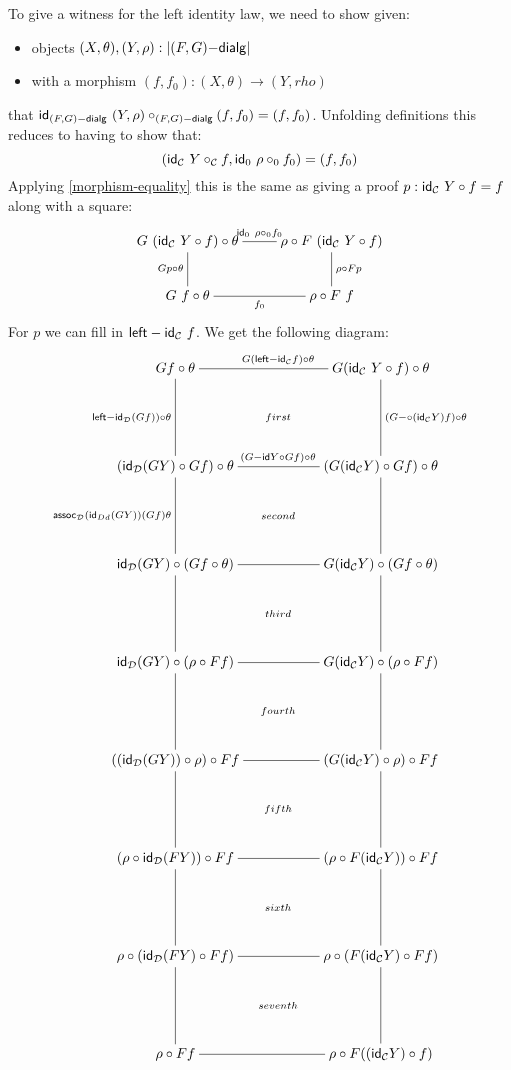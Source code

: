 To give a witness for the left identity law, we need to show given:
\begin{itemize}
\item objects $(X,\theta), (Y,\rho) : |(F,G)\mathsf{-dialg}|$
\item with a morphism $(f,f_0) : (X,\theta) \to (Y,rho)$
\end{itemize}
that $\mathsf{id}_{(F,G)\mathsf{-dialg}}\ (Y,\rho) \circ_{(F,G)\mathsf{-dialg}} (f,f_0) = (f,f_0)$. Unfolding definitions this reduces to having to show that:
$$
(\mathsf{id}_{\mathcal{C}}\ Y \circ_{\mathcal{C}} f , \mathsf{id}_0\ \rho \circ_0 f_0) = (f,f_0)
$$
Applying \cref{morphism-equality} this is the same as giving a proof $p : \mathsf{id}_{\mathcal{C}}\ Y \circ f = f$ along with a square:
$$
\xymatrix{
  G\ (\id_{\Cc}\ Y \circ f) \circ \theta
  \ar@{-}[r]^{\id_0\ \rho \circ_0 f_0}
  \ar@{-}[d]_{G p \circ \theta}
  &\rho \circ F\ (\id_{\Cc}\ Y \circ f)
  \ar@{-}[d]^{\rho \circ F p}
  \\
  G\ f \circ \theta
  \ar@{-}[r]_{f_0}
  &\rho \circ F\ f
}
$$
For $p$ we can fill in $\mathsf{left-id}_{\mathcal{C}}\ f$. We get the following
diagram:
$$
\xymatrix{
G f \circ \theta
\ar@{-}[rr]^{G (\leftid_{\Cc} f) \circ \theta}
\ar@{-}[dd]_{\leftid_{\Dd} (G f)) \circ \theta}
\ar@{}[ddrr]|{first}
&&G (\id_{\Cc}\ Y \circ f) \circ \theta
\ar@{-}[dd]^{(\Gcomp (\id_{\Cc} Y) f) \circ \theta}
\\
\\
(\id_{\Dd} (G Y) \circ G f) \circ \theta
\ar@{-}[rr]^{(\Gid Y \circ G f) \circ \theta}
\ar@{-}[dd]_{\assoc_{\Dd} (\id_{Dd} (G Y)) (G f) \theta}
\ar@{}[ddrr]|{second}
&&(G (\id_{\Cc} Y) \circ G f) \circ \theta
\ar@{-}[dd]
\\
\\
\id_{\Dd} (G Y) \circ (G f \circ \theta)
\ar@{-}[rr]
\ar@{-}[dd]
\ar@{}[ddrr]|{third}
&&G (\id_{\Cc} Y) \circ (G f \circ \theta)
\ar@{-}[dd]
\\
\\
\id_{\Dd} (G Y) \circ (\rho \circ F f)
\ar@{-}[rr]
\ar@{-}[dd]
\ar@{}[ddrr]|{fourth}
&&G (\id_{\Cc} Y) \circ (\rho \circ F f)
\ar@{-}[dd]
\\
\\
((\id_{\Dd} (G Y)) \circ \rho) \circ F f
\ar@{-}[rr]
\ar@{-}[dd]
\ar@{}[ddrr]|{fifth}
&&(G (\id_{\Cc} Y) \circ \rho) \circ F f
\ar@{-}[dd]
\\
\\
(\rho \circ \id_{\Dd} (F Y)) \circ F f
\ar@{-}[rr]
\ar@{-}[dd]
\ar@{}[ddrr]|{sixth}
&&(\rho \circ F (\id_{\Cc} Y)) \circ F f
\ar@{-}[dd]
\\
\\
\rho \circ (\id_{\Dd} (F Y) \circ F f)
\ar@{-}[rr]
\ar@{-}[dd]
\ar@{}[ddrr]|{seventh}
&&\rho \circ (F (\id_{\Cc} Y) \circ F f)
\ar@{-}[dd]
\\
\\
\rho \circ F f
\ar@{-}[rr]
&&\rho \circ F ((\id_{\Cc} Y) \circ f)
}
$$


